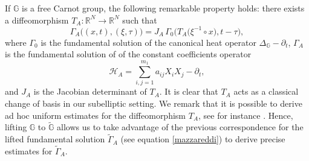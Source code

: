 \documentclass[11pt,a4paper]{article}
\numberwithin{equation}{section}
\newcommand{\R}{\mathbb{R}}
\def \tt {\tilde}
\def \GG {{\mathbb{G}}}
\def \p {\partial}
\def \G {{\Gamma}}
\def \t {{\tau}}
\def \x {{\xi}}
\begin{document}
If $\GG$ is a free Carnot group, the following remarkable property holds: there exists a diffeomorphism $T_A : \R^N \rightarrow \R^N$ such that 
\begin{equation*}
	\G_A\big((x,t),(\xi,\tau)\big)=J_A\, \G_0\Big(T_A\big(\x^{-1}\circ x	\big),t-\t\Big),
\end{equation*}
where $\G_0$ is the fundamental solution of the canonical heat operator $\Delta_{\GG}-\partial_t$, $\G_A$ is the fundamental solution of of the constant coefficients operator 
\begin{equation}\label{marina di acate}
	\mathscr{H}_A=\sum_{i,j=1}^{m_1}a_{ij}X_iX_j-\p_t,
\end{equation}
and $J_A$ is the Jacobian determinant of $T_A$. It is clear that $T_A$ acts as a classical change of basis in our subelliptic setting. We remark that it is possible to derive ad hoc uniform estimates for the diffeomorphism $T_A$, see for instance \cite{bonfiglioli2004families}. Hence, lifting $\GG$ to  $\tt \GG$ allows us to take advantage of the previous correspondence for the lifted fundamental solution $\tilde{\G}_A$ (see equation \eqref{mazzareddi}) to derive precise estimates for $\tilde{\G}_A$. 
\end{document}
